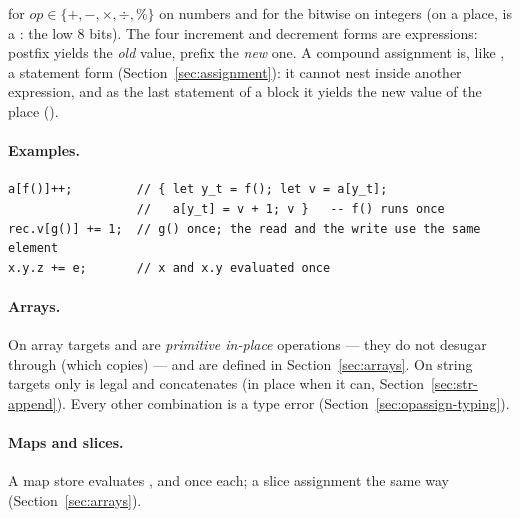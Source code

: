 \noindent for $op \in \{+,-,\times,\div,\%\}$ on numbers and for the
bitwise \ic{\&} \ic{|} \ic{\textasciicircum{}} \ic{<{}<} \ic{>{}>}
\ic{>{}>{}>} on integers (on a  place,  is a :
the low 8 bits). The four
increment and decrement forms are expressions: postfix yields the
\emph{old} value, prefix the \emph{new} one. A compound assignment is,
like \ic{=}, a statement form (Section~\ref{sec:assignment}): it cannot
nest inside another expression, and as the last statement of a block it
yields the new value of the place ().

\paragraph{Examples.}
\begin{lstlisting}
a[f()]++;         // { let y_t = f(); let v = a[y_t];
                  //   a[y_t] = v + 1; v }   -- f() runs once
rec.v[g()] += 1;  // g() once; the read and the write use the same element
x.y.z += e;       // x and x.y evaluated once
\end{lstlisting}

\paragraph{Arrays.} On array targets \ic{+=} and \ic{*=} are
\emph{primitive in-place} operations --- they do not desugar through
\ic{+} (which copies) --- and are defined in Section~\ref{sec:arrays}.
On string targets only \ic{+=} is legal and concatenates (in place when
it can, Section~\ref{sec:str-append}). Every other
combination is a type error (Section~\ref{sec:opassign-typing}).

\paragraph{Maps and slices.} A map store  evaluates ,
 and  once each; a slice assignment  the same
way (Section~\ref{sec:arrays}).
